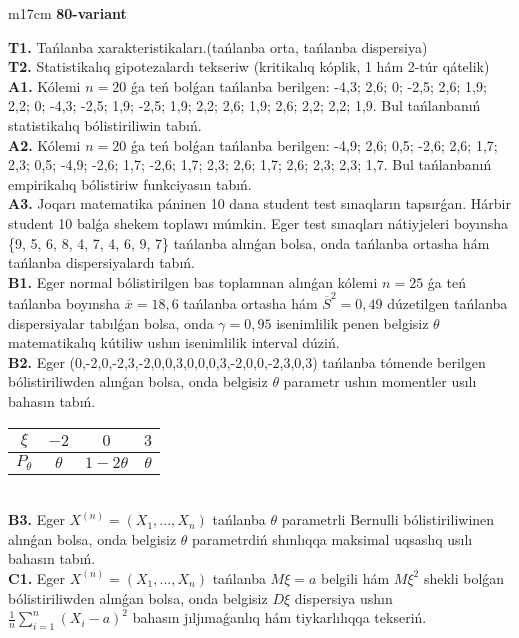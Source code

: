 \documentclass{article}
\begin{document}
\begin{tabular}{m{17cm}}
\textbf{80-variant}
\newline

\textbf{T1.} 
Tańlanba xarakteristikaları.(tańlanba orta, tańlanba dispersiya)
 \\
\textbf{T2.} 
Statistikalıq gipotezalardı tekseriw (kritikalıq kóplik, 1 hám 2-túr qátelik)
 \\
\textbf{A1.} 
Kólemi \(n = 20\) ǵa teń bolǵan tańlanba berilgen: -4,3; 2,6; 0; -2,5; 2,6; 1,9; 2,2; 0; -4,3; -2,5; 1,9; -2,5; 1,9; 2,2; 2,6; 1,9; 2,6; 2,2; 2,2; 1,9. Bul tańlanbanıń statistikalıq bólistiriliwin tabıń.
 \\
\textbf{A2.} 
Kólemi \(n = 20\) ǵa teń bolǵan tańlanba berilgen: -4,9; 2,6; 0,5; -2,6; 2,6; 1,7; 2,3; 0,5; -4,9; -2,6; 1,7; -2,6; 1,7; 2,3; 2,6; 1,7; 2,6; 2,3; 2,3; 1,7. Bul tańlanbanıń empirikalıq bólistiriw funkciyasın tabıń.
 \\
\textbf{A3.} 
Joqarı matematika páninen 10 dana student test sınaqların tapsırǵan. Hárbir student 10 balǵa shekem toplawı múmkin. Eger test sınaqları nátiyjeleri boyınsha \{9, 5, 6, 8, 4, 7, 4, 6, 9, 7\} tańlanba alınǵan bolsa, onda tańlanba ortasha hám tańlanba dispersiyalardı tabıń.
 \\
\textbf{B1.} 
Eger normal bólistirilgen bas toplamnan alınǵan kólemi \(n = 25\) ǵa teń tańlanba boyınsha \(\overline{x} = 18,6\) tańlanba ortasha hám \({\overline{S}}^{2} = 0,49\) dúzetilgen tańlanba dispersiyalar tabılǵan bolsa, onda \(\gamma = 0,95\) isenimlilik penen belgisiz \(\theta\) matematikalıq kútiliw ushın isenimlilik interval dúziń.
 \\
\textbf{B2.} 
Eger (0,-2,0,-2,3,-2,0,0,3,0,0,0,3,-2,0,0,-2,3,0,3) tańlanba tómende berilgen bólistiriliwden alınǵan bolsa, onda belgisiz \(\theta\) parametr ushın momentler usılı bahasın tabıń.
\begin{tabular}{|c|c|c|c|}
  \hline
$\xi$ & $- 2$  & $0$  & $3$ \\
\hline
\(P_{\theta}\) & \(\theta\) & \(1 - 2\theta\) & \(\theta\) \\
\hline
\end{tabular}
 \\
\textbf{B3.} 
Eger \(X^{(n)} = \left( X_{1},...,X_{n} \right)\) tańlanba \(\theta\) parametrli Bernulli bólistiriliwinen alınǵan bolsa, onda belgisiz \(\theta\) parametrdiń shınlıqqa maksimal uqsaslıq usılı bahasın tabıń.
 \\
\textbf{C1.} 
Eger \(X^{(n)} = \left( X_{1},...,X_{n} \right)\) tańlanba \(M\xi = a\) belgili hám \(M\xi^{2}\) shekli bolǵan bólistiriliwden alınǵan bolsa, onda belgisiz \(D\xi\) dispersiya ushın \(\frac{1}{n}\sum_{i = 1}^{n}\left( X_{i} - a \right)^{2}\) bahasın jıljımaǵanlıq hám tiykarlılıqqa tekseriń.

\end{tabular}
\end{document}
